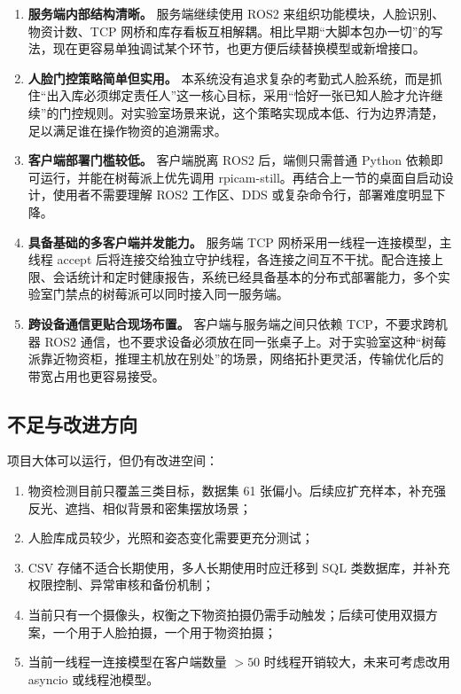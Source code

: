 \documentclass[12pt]{article}
\newcommand{\code}[1]{{\ttfamily #1}}
\begin{document}
\begin{enumerate}
	\item \textbf{服务端内部结构清晰。} 服务端继续使用 ROS2 来组织功能模块，人脸识别、物资计数、TCP 网桥和库存看板互相解耦。相比早期“大脚本包办一切”的写法，现在更容易单独调试某个环节，也更方便后续替换模型或新增接口。

	\item \textbf{人脸门控策略简单但实用。} 本系统没有追求复杂的考勤式人脸系统，而是抓住“出入库必须绑定责任人”这一核心目标，采用“恰好一张已知人脸才允许继续”的门控规则。对实验室场景来说，这个策略实现成本低、行为边界清楚，足以满足谁在操作物资的追溯需求。

	\item \textbf{客户端部署门槛较低。} 客户端脱离 ROS2 后，端侧只需普通 Python 依赖即可运行，并能在树莓派上优先调用 \code{rpicam-still}。再结合上一节的桌面自启动设计，使用者不需要理解 ROS2 工作区、DDS 或复杂命令行，部署难度明显下降。

	\item \textbf{具备基础的多客户端并发能力。} 服务端 TCP 网桥采用一线程一连接模型，主线程 \code{accept} 后将连接交给独立守护线程，各连接之间互不干扰。配合连接上限、会话统计和定时健康报告，系统已经具备基本的分布式部署能力，多个实验室门禁点的树莓派可以同时接入同一服务端。

	\item \textbf{跨设备通信更贴合现场布置。} 客户端与服务端之间只依赖 TCP，不要求跨机器 ROS2 通信，也不要求设备必须放在同一张桌子上。对于实验室这种“树莓派靠近物资柜，推理主机放在别处”的场景，网络拓扑更灵活，传输优化后的带宽占用也更容易接受。
\end{enumerate}

\subsection{不足与改进方向}

项目大体可以运行，但仍有改进空间：

\begin{enumerate}
	\item 物资检测目前只覆盖三类目标，数据集 61 张偏小。后续应扩充样本，补充强反光、遮挡、相似背景和密集摆放场景；
	\item 人脸库成员较少，光照和姿态变化需要更充分测试；
	\item CSV 存储不适合长期使用，多人长期使用时应迁移到 SQL 类数据库，并补充权限控制、异常审核和备份机制；
	\item 当前只有一个摄像头，权衡之下物资拍摄仍需手动触发；后续可使用双摄方案，一个用于人脸拍摄，一个用于物资拍摄；
	\item 当前一线程一连接模型在客户端数量 $> 50$ 时线程开销较大，未来可考虑改用 \code{asyncio} 或线程池模型。
\end{enumerate}
\end{document}
